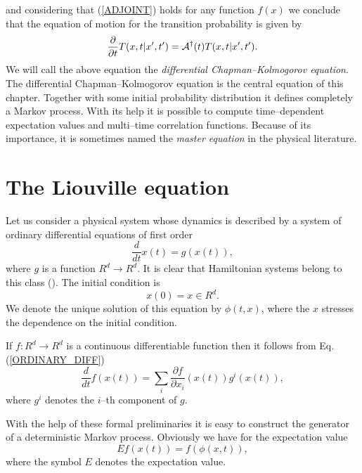 and considering that (\ref{ADJOINT}) holds for any 
function $f(x)$ we conclude that the equation of motion for the 
transition probability is given by
\begin{equation}
\label{KOL_FORWARD}
\frac{\partial}{\partial t} T(x,t|x',t') =
{\cal{A}}^{\dagger}(t) T(x,t|x',t').
\end{equation}
We will call the above equation the {\em differential 
Chapman--Kolmogorov equation}. The differential 
Chapman--Kolmogorov equation is the central equation of this 
chapter. Together with some initial probability distribution it 
defines completely a Markov process. With its help it is possible
to compute time--dependent expectation values and multi--time 
correlation functions. Because of its importance, it is sometimes
named the {\em master equation} in the physical literature.

\section{The Liouville equation}
Let us consider a physical system whose dynamics is described
by a system of ordinary differential equations of first order
\begin{equation}
\label{ORDINARY_DIFF}
\frac{d}{dt} x(t) = g(x(t)),
\end{equation}
where $g$ is a function $R^d \rightarrow R^d$. 
It is clear that Hamiltonian systems belong to this class 
(\cite{ARNOLD}). The initial 
condition is
\begin{equation*}
x(0) = x \in R^d.
\end{equation*}
We denote the unique solution of this equation by $\phi(t,x)$,
where the $x$ stresses the dependence on the initial condition.

If $f:R^d \rightarrow R^d$ is a continuous differentiable function
then it follows from Eq. (\ref{ORDINARY_DIFF}) 
\begin{equation}\label{COORDINATE_FREE}
\frac{d}{dt} f(x(t)) = \sum_i \frac{\partial f}{\partial x_i}
          (x(t)) g^i(x(t)),
\end{equation}
where $g^i$ denotes the $i$--th component of $g$. 


With the help of these formal preliminaries it is easy to 
construct the generator of a deterministic Markov process.
Obviously we have for the expectation value
\begin{equation*}
Ef(x(t)) = f(\phi(x,t)),
\end{equation*}
where the symbol $E$ denotes the expectation value.

